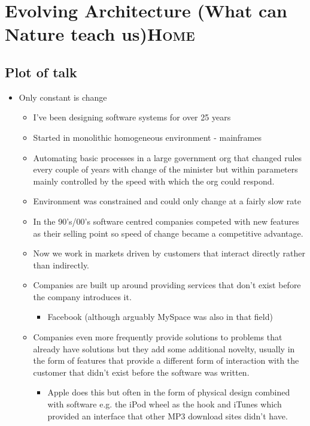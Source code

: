 \documentclass[11pt]{article}
\author{Chris}
\date{\today}
\title{}
\begin{document}
\tableofcontents

\section{Evolving Architecture (What can Nature teach us)\hfill{}\textsc{Home}}
\label{sec:org7cd6d50}

\subsection{Plot of talk}
\label{sec:org8e3642d}

\begin{itemize}
\item Only constant is change
\begin{itemize}
\item I've been designing software systems for over 25 years
\item Started in monolithic homogeneous environment - mainframes
\item Automating basic processes in a large government org that changed rules every couple of years with change of the minister but within parameters mainly controlled by the speed with which the org could respond.
\item Environment was constrained and could only change at a fairly slow rate
\item In the 90's/00's software centred companies competed with new features as their selling point so speed of change became a competitive advantage.
\item Now we work in markets driven by customers that interact directly rather than indirectly.
\item Companies are built up around providing services that don't exist before the company introduces it.
\begin{itemize}
\item Facebook (although arguably MySpace was also in that field)
\end{itemize}
\item Companies even more frequently provide solutions to problems that already have solutions but they add some additional novelty, usually in the form of features that provide a different form of
interaction with the customer that didn't exist before the software was written.
\begin{itemize}
\item Apple does this but often in the form of physical design combined with software e.g. the iPod wheel as the hook and iTunes which provided an interface that other MP3 download sites didn't have.

\end{itemize}
\end{itemize}
\end{itemize}
\end{document}
